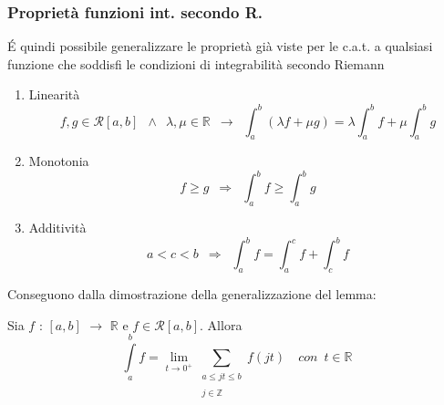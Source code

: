\documentclass[10pt]{article}
\theoremstyle{plain}
\begin{document}
\subsubsection{Proprietà funzioni int. secondo R.}
\'E quindi possibile generalizzare le proprietà già viste per le c.a.t. a qualsiasi funzione che soddisfi le condizioni di integrabilità secondo Riemann
\begin{enumerate}
    \item Linearità
    \[f,g \in \mathcal{R}[a,b] \enspace \land \enspace \lambda, \mu \in \mathbb{R} \enspace \rightarrow \enspace \int_a^b (\lambda f + \mu g) = \lambda \int_a^b f + \mu \int_a^b g\]
    \item Monotonia
    \[f \geq g \enspace \Rightarrow \enspace \int_a^b f \geq \int_a^b g\]
    \item Additività
    \[a < c < b \enspace \Rightarrow \enspace \int_a^b f = \int_a^c f + \int_c^b f\]
\end{enumerate}
Conseguono dalla dimostrazione della generalizzazione del lemma:
\begin{lem}
    Sia $f$ : $[a,b]$ $\rightarrow$ $\mathbb{R}$ e $f \in \mathcal{R}[a,b]$. Allora
    \[\int\limits_{a}^{b} f = \lim\limits_{t \rightarrow 0^+}^{} \sum_{\substack{a \leq jt \leq b \\~\\ j \in \mathbb{Z}}} f(jt) \quad con \enspace t \in \mathbb{R}\]
\end{lem}
\end{document}
